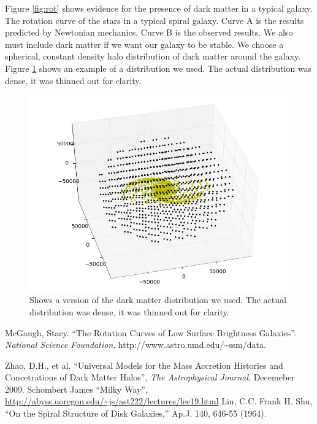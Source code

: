 \documentclass{report}
\begin{document}
Figure \ref{fig:rot} shows evidence for the presence of dark matter in a typical galaxy.\cite{dark-halo} The rotation curve of the stars in a typical spiral galaxy. Curve A is the results predicted by
 Newtonian mechanics. Curve B is the observed results. We also must include dark matter if we want our galaxy to be stable. We choose a spherical, constant density halo distribution of dark matter around the galaxy. Figure \ref{fig:dark} shows an example of a distribution we used. The actual distribution was dense, it was thinned out for clarity.

\begin{figure}[H]
 \centering
 \includegraphics[width=\textwidth]{./darkmatterdist.png}
  \caption{Shows a version of the dark matter distribution we used. The actual distribution was dense, it was thinned out for clarity. } 
 \label{fig:dark}
\end{figure}

\begin{thebibliography}{99}

	McGaugh, Stacy.
	``The Rotation Curves of Low Surface Brightness Galaxies''.
	\emph{National Science Foundation},
	http://www.astro.umd.edu/\textasciitilde ssm/data.

	Zhao, D.H., et al.
	``Universal Models for the Mass Accretion Histories and Concetrations of Dark Matter Halos'',
	\emph{The Astrophysical Journal},
	Decemeber 2009.
	Schombert James 
	``Milky Way'', \url{http://abyss.uoregon.edu/~js/ast222/lectures/lec19.html}
	Lin, C.C. 
	Frank H. Shu, 
	“On the Spiral Structure of Disk Galaxies,” 
	Ap.J. 140, 646-55 (1964).
\end{thebibliography}
\end{document}
